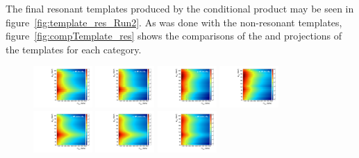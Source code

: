 The final resonant templates produced by the conditional product may be seen in figure~\ref{fig:template_res_Run2}.
As was done with the non-resonant templates, figure~\ref{fig:compTemplate_res} shows the comparisons of the \MVV and \MJ projections of the templates for each category.

\begin{figure}[htbp]
  \centering
  \includegraphics[width=0.2\textwidth]{fig/analysis/template_res_mu_HP_bb_LDy.pdf}
  \includegraphics[width=0.2\textwidth]{fig/analysis/template_res_e_HP_bb_LDy.pdf}
  \includegraphics[width=0.2\textwidth]{fig/analysis/template_res_mu_LP_bb_LDy.pdf}
  \includegraphics[width=0.2\textwidth]{fig/analysis/template_res_e_LP_bb_LDy.pdf}\\
  \includegraphics[width=0.2\textwidth]{fig/analysis/template_res_mu_HP_nobb_LDy.pdf}
  \includegraphics[width=0.2\textwidth]{fig/analysis/template_res_e_HP_nobb_LDy.pdf}
  \includegraphics[width=0.2\textwidth]{fig/analysis/template_res_mu_LP_nobb_LDy.pdf}

\end{figure}
